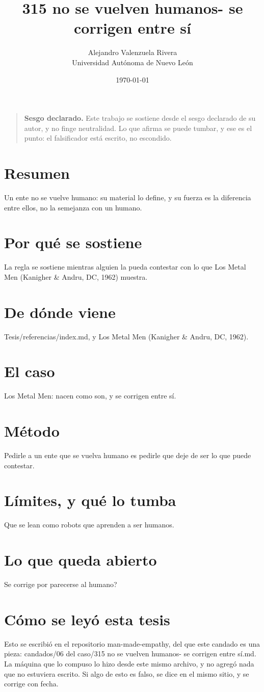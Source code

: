 \documentclass[11pt,a4paper]{article}
\title{315 no se vuelven humanos- se corrigen entre sí}
\author{Alejandro Valenzuela Rivera\\\small Universidad Autónoma de Nuevo León}
\date{\today}
\begin{document}
\maketitle

\begin{quote}
\textbf{Sesgo declarado.} Este trabajo se sostiene desde el sesgo declarado de su autor, y no finge neutralidad. Lo que afirma se puede tumbar, y ese es el punto: el falsificador está escrito, no escondido.
\end{quote}

\section*{Resumen}
Un ente no se vuelve humano: su material lo define, y su fuerza es la diferencia entre ellos, no la semejanza con un humano.

\section{Por qué se sostiene}
La regla se sostiene mientras alguien la pueda contestar con lo que Los Metal Men (Kanigher \& Andru, DC, 1962) muestra.

\section{De dónde viene}
Tesis/referencias/index.md, y Los Metal Men (Kanigher \& Andru, DC, 1962).

\section{El caso}
Los Metal Men: nacen como son, y se corrigen entre sí.

\section{Método}
Pedirle a un ente que se vuelva humano es pedirle que deje de ser lo que puede contestar.

\section{Límites, y qué lo tumba}
Que se lean como robots que aprenden a ser humanos.

\section{Lo que queda abierto}
\textquestiondown{}Se corrige por parecerse al humano?

\section*{Cómo se leyó esta tesis}
Esto se escribió en el repositorio man-made-empathy, del que este candado es una pieza: candados/06 del caso/315 no se vuelven humanos- se corrigen entre sí.md. La máquina que lo compuso lo hizo desde este mismo archivo, y no agregó nada que no estuviera escrito. Si algo de esto es falso, se dice en el mismo sitio, y se corrige con fecha.
\end{document}
